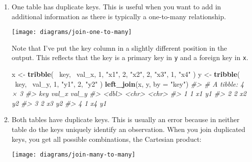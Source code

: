 \documentclass[]{book}
\newenvironment{Shaded}{\begin{snugshade}}{\end{snugshade}}
\newcommand{\KeywordTok}[1]{\textcolor[rgb]{0.13,0.29,0.53}{\textbf{{#1}}}}
\newcommand{\DataTypeTok}[1]{\textcolor[rgb]{0.13,0.29,0.53}{{#1}}}
\newcommand{\DecValTok}[1]{\textcolor[rgb]{0.00,0.00,0.81}{{#1}}}
\newcommand{\StringTok}[1]{\textcolor[rgb]{0.31,0.60,0.02}{{#1}}}
\newcommand{\CommentTok}[1]{\textcolor[rgb]{0.56,0.35,0.01}{\textit{{#1}}}}
\newcommand{\NormalTok}[1]{{#1}}
\begin{document}
\begin{enumerate}
\def\labelenumi{\arabic{enumi}.}
\item
  One table has duplicate keys. This is useful when you want to add in
  additional information as there is typically a one-to-many
  relationship.

  \begin{center}\texttt{[image: diagrams/join-one-to-many]} \end{center}

  Note that I've put the key column in a slightly different position in
  the output. This reflects that the key is a primary key in \texttt{y}
  and a foreign key in \texttt{x}.

\begin{Shaded}
\begin{Highlighting}[]
\NormalTok{x <-}\StringTok{ }\KeywordTok{tribble}\NormalTok{(}
  \NormalTok{~key, ~val_x,}
     \DecValTok{1}\NormalTok{, }\StringTok{"x1"}\NormalTok{,}
     \DecValTok{2}\NormalTok{, }\StringTok{"x2"}\NormalTok{,}
     \DecValTok{2}\NormalTok{, }\StringTok{"x3"}\NormalTok{,}
     \DecValTok{1}\NormalTok{, }\StringTok{"x4"}
\NormalTok{)}
\NormalTok{y <-}\StringTok{ }\KeywordTok{tribble}\NormalTok{(}
  \NormalTok{~key, ~val_y,}
     \DecValTok{1}\NormalTok{, }\StringTok{"y1"}\NormalTok{,}
     \DecValTok{2}\NormalTok{, }\StringTok{"y2"}
\NormalTok{)}
\KeywordTok{left_join}\NormalTok{(x, y, }\DataTypeTok{by =} \StringTok{"key"}\NormalTok{)}
\CommentTok{#> # A tibble: 4 × 3}
\CommentTok{#>     key val_x val_y}
\CommentTok{#>   <dbl> <chr> <chr>}
\CommentTok{#> 1     1    x1    y1}
\CommentTok{#> 2     2    x2    y2}
\CommentTok{#> 3     2    x3    y2}
\CommentTok{#> 4     1    x4    y1}
\end{Highlighting}
\end{Shaded}
\item
  Both tables have duplicate keys. This is usually an error because in
  neither table do the keys uniquely identify an observation. When you
  join duplicated keys, you get all possible combinations, the Cartesian
  product:

  \begin{center}\texttt{[image: diagrams/join-many-to-many]} \end{center}


\end{enumerate}
\end{document}
